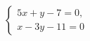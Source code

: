 \begin{ex}
	\begin{condition}
		\( \left\{
		\begin{array}{l}
			5x+y-7=0,\\
			x-3y-11=0
		\end{array}
		\right. \)
	\end{condition}
\end{ex}